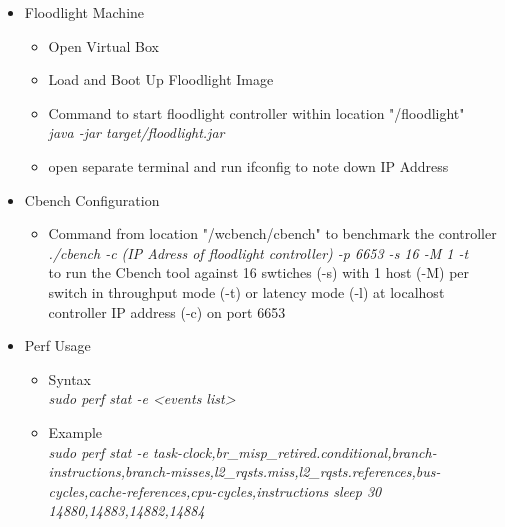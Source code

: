 \begin{itemize}
    
    \item Floodlight Machine 
    
    \begin{itemize}
    
        \item Open Virtual Box
        \item Load and Boot Up Floodlight Image
        \item Command to start floodlight controller within location "/floodlight"\\
        \emph{java -jar target/floodlight.jar}
        \item open separate terminal and run ifconfig to note down IP Address
        
    \end{itemize}
    
    \item Cbench Configuration
    
    \begin{itemize}
    
        \item Command from location "/wcbench/cbench" to benchmark the controller\\
        \emph{./cbench -c (IP Adress of floodlight controller) -p 6653 -s 16 -M 1 -t}\\
        
        to run the Cbench tool against 16 swtiches (-s) with 1 host (-M) per switch in throughput mode (-t) or latency mode (-l)
        at localhost controller IP address (-c)  on port 6653  
    
        \end{itemize}
    
    \item Perf Usage
    
    \begin{itemize}
    
        \item Syntax\\
        \emph{sudo perf stat -e <events list> } \\
    \end{itemize}
    
    \begin{itemize}
        \item Example\\
        \emph{sudo perf stat -e task-clock,br\_misp\_retired.conditional,branch-instructions,branch-misses,l2\_rqsts.miss,l2\_rqsts.references,bus-cycles,cache-references,cpu-cycles,instructions  sleep 30 14880,14883,14882,14884}\\
    \end{itemize}
\end{itemize}
